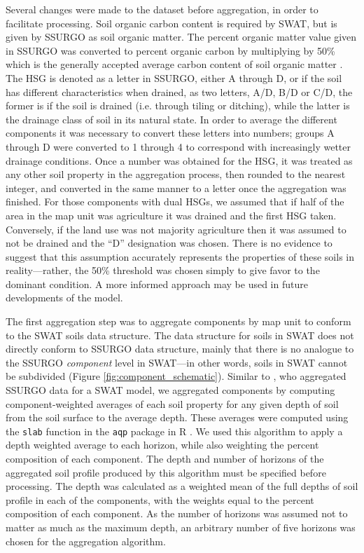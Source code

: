 Several changes were made to the dataset before aggregation, in order to
facilitate processing. Soil organic carbon content is required by SWAT, but is
given by SSURGO as soil organic matter. The percent organic matter value given in SSURGO
was converted to percent organic carbon by multiplying by 50\% which is the generally accepted average carbon content of soil organic matter \citep{brady_elements_2004}. 
The HSG is denoted as a letter in SSURGO, either A through D, or if the soil has different characteristics when drained,
as two letters, A/D, B/D or C/D, the former is if the soil is drained (i.e. through tiling or ditching), 
while the latter is the drainage class of soil in its natural state.
In order to average the different components it was necessary to convert these letters
into numbers; groups A through D were converted to 1 through 4 to correspond
with increasingly wetter drainage conditions. Once a number was obtained for the
HSG, it was treated as any other soil property in the aggregation process,
then rounded to the nearest integer, and converted in the same manner to a letter
once the aggregation was finished. For those components with dual HSGs, we
assumed that if half of the area in the map unit was agriculture it was drained
and the first HSG taken. Conversely, if the land use was not majority agriculture
then it was assumed to not be drained and the ``D'' designation was chosen. There is no evidence to suggest that this assumption accurately represents the properties of these soils in reality---rather, the 50\% threshold was chosen simply to give favor to the dominant condition. A more informed approach may be used in future developments of the model.

The first aggregation step was to aggregate components by map unit to conform to
the SWAT soils data structure. The data structure for soils in SWAT does not
directly conform to SSURGO data structure, mainly that there is no analogue to the
SSURGO \textit{component} level in SWAT---in other words, soils in SWAT cannot
be subdivided (Figure \ref{fig:component_schematic}). 
Similar to \citet{gatzke_aggregation_2011}, who aggregated SSURGO data for a SWAT model, 
we aggregated components by computing
component-weighted averages of each soil property for any given depth of soil from the soil surface to the average depth.
These averages were computed using the \texttt{slab} function in the \texttt{aqp} package in R \citep{beaudette_algorithms_2013}. We
used this algorithm to apply a depth weighted average to each horizon, while
also weighting the percent composition of each component. The depth and number of horizons of
the aggregated soil profile produced by this algorithm must be specified before
processing. The depth was calculated as a weighted mean of the full depths of
soil profile in each of the components, with the weights equal to the percent composition of each
component. As the number of horizons was assumed not to matter as much as the
maximum depth, an arbitrary number of five horizons was chosen for the
aggregation algorithm.

